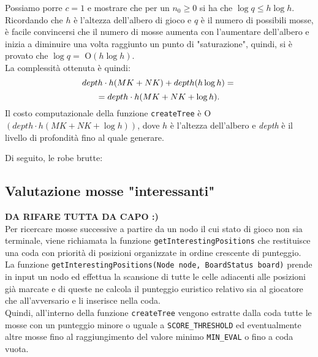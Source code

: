 \documentclass[11pt]{article}
\begin{document}
Possiamo porre $c = 1$ e mostrare che per un $n_0 \geq 0 $ si ha che $\log q \leq h \log h$.\\
Ricordando che $h$ è l'altezza dell'albero di gioco e $q$ è il numero di possibili mosse, è facile convincersi che il numero di mosse aumenta con l'aumentare dell'albero e inizia a diminuire una volta raggiunto un punto di "saturazione", quindi, si è provato che $\log q =$ O$(h\log h)$.\\
La complessità ottenuta è quindi:
\begin{equation*}
depth \cdot h(MK+NK)+depth(h\log h)=\\
\end{equation*}
\begin{equation*}
=depth \cdot h(MK+NK+\log h).\\
\end{equation*}
Il costo computazionale della funzione \texttt{createTree} è O$(depth \cdot h(MK+NK+\log h))$, dove $h$ è l'altezza dell'albero e \textit{depth} è il livello di profondità fino al quale generare.

\newpage
Di seguito, le robe brutte:
\newpage

\subsection*{Valutazione mosse "interessanti"}
\textbf{DA RIFARE TUTTA DA CAPO :)}\\
Per ricercare mosse successive a partire da un nodo il cui stato di gioco non sia terminale, viene richiamata la funzione \texttt{getInterestingPositions} che restituisce una coda con priorità di posizioni organizzate in ordine crescente di punteggio.\\
La funzione \texttt{getInterestingPositions(Node node, BoardStatus board)} prende in input un nodo ed effettua la scansione di tutte le celle adiacenti alle posizioni già marcate e di queste ne calcola il punteggio euristico relativo sia al giocatore che all'avversario e li inserisce nella coda.\\
Quindi, all'interno della funzione \texttt{createTree} vengono estratte dalla coda tutte le mosse con un punteggio minore o uguale a \texttt{SCORE\_THRESHOLD} ed eventualmente altre mosse fino al raggiungimento del valore minimo \texttt{MIN\_EVAL} o fino a coda vuota.
\end{document}
